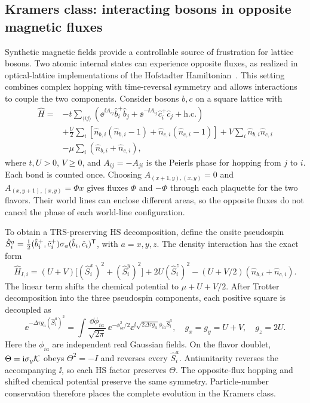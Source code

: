 \subsection{Kramers class: interacting bosons in opposite magnetic fluxes}
\label{app:trs_hofstadter}

Synthetic magnetic fields provide a controllable source of frustration for lattice bosons. Two atomic internal states can experience opposite fluxes, as realized in optical-lattice implementations of the Hofstadter Hamiltonian~\cite{aidelsburger2013}. This setting combines complex hopping with time-reversal symmetry and allows interactions to couple the two components. Consider bosons $b,c$ on a square lattice with
\begin{equation}
\begin{aligned}
    \hat H={}&-t\sum_{\langle ij\rangle}\left(
       \ee^{\ii A_{ij}}\hat b_i^+\hat b_j
       +\ee^{-\ii A_{ij}}\hat c_i^+\hat c_j+\mathrm{h.c.}\right)\\
    &+\frac{U}{2}\sum_i\left[
       \hat n_{b,i}(\hat n_{b,i}-1)
       +\hat n_{c,i}(\hat n_{c,i}-1)\right]
       +V\sum_i\hat n_{b,i}\hat n_{c,i}\\
    &-\mu\sum_i(\hat n_{b,i}+\hat n_{c,i}),
\end{aligned}
\label{eq:trs_hofstadter_H}
\end{equation}
where $t,U>0$, $V\ge0$, and $A_{ij}=-A_{ji}$ is the Peierls phase for hopping from $j$ to $i$. Each bond is counted once. Choosing $A_{(x+1,y),(x,y)}=0$ and $A_{(x,y+1),(x,y)}=\Phi x$ gives fluxes $\Phi$ and $-\Phi$ through each plaquette for the two flavors. Their world lines can enclose different areas, so the opposite fluxes do not cancel the phase of each world-line configuration.

To obtain a TRS-preserving HS decomposition, define the onsite pseudospin $\hat S_i^a=\frac12(\hat b_i^+,\hat c_i^+)\sigma_a(\hat b_i,\hat c_i)^{\mathsf{T}}$, with $a=x,y,z$. The density interaction has the exact form
\begin{equation}
    \hat H_{I,i}=(U+V)\bigl[(\hat S_i^x)^2+(\hat S_i^y)^2\bigr]
      +2U(\hat S_i^z)^2
      -(U+V/2)(\hat n_{b,i}+\hat n_{c,i}).
    \label{eq:trs_hofstadter_interaction}
\end{equation}
The linear term shifts the chemical potential to $\mu+U+V/2$. After Trotter decomposition into the three pseudospin components, each positive square is decoupled as
\begin{equation}
    \ee^{-\Delta\tau g_a(\hat S_i^a)^2}
      =\int\frac{\dd\phi_{ia}}{\sqrt{2\pi}}\,
        \ee^{-\phi_{ia}^2/2}
        \ee^{\ii\sqrt{2\Delta\tau g_a}\,\phi_{ia}\hat S_i^a},
    \quad g_x=g_y=U+V,\quad g_z=2U.
    \label{eq:trs_hofstadter_HS}
\end{equation}
Here the $\phi_{ia}$ are independent real Gaussian fields. On the flavor doublet, $\Theta=\mathrm{i}\sigma_y\mathcal{K}$ obeys $\Theta^2=-I$ and reverses every $\hat S_i^a$. Antiunitarity reverses the accompanying $\ii$, so each HS factor preserves $\Theta$. The opposite-flux hopping and shifted chemical potential preserve the same symmetry. Particle-number conservation therefore places the complete evolution in the Kramers class.

